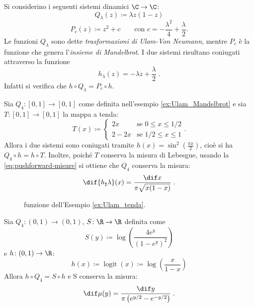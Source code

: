 \begin{example} \label{ex:Ulam_Mandelbrot}
Si considerino i seguenti sistemi dinamici $ \C \to \C$:
\[ Q_\lambda(z) \coloneqq \lambda z (1-z) \]
\[ P_c(z) \coloneqq z^2 + c \qquad \text{con } c = - \frac{\lambda^2}{4} +  \frac{\lambda}{2}. \]
Le funzioni $ Q_\lambda $ sono dette \emph{trasformazioni di Ulam-Von Neumann}, mentre $P_c$ è la funzione che genera l'\emph{insieme di Mandelbrot}.
I due sistemi risultano coniugati attraverso la funzione
\[ h_\lambda(z) = -\lambda z + \frac{\lambda}{2}\;. \]
Infatti si verifica che $ h\circ Q_\lambda = P_c \circ h $.
\end{example}

\begin{example} \label{ex:Ulam_tenda}
    Sia $ Q_4 \colon [0,1] \to [0,1] $ come definita nell'esempio \ref{ex:Ulam_Mandelbrot} e sia $ T\colon [0,1] \to [0,1] $ la mappa a tenda:
    \[
        T(x) \coloneqq
        \begin{cases}
            2x   & \text{se } 0 \leq x \leq 1/2 \\
            2-2x & \text{se } 1/2 \leq x \leq 1
        \end{cases}.
    \]
    Allora i due sistemi sono coniugati tramite $ h(x) = \sin^2\left(\frac{\pi x}{2}\right) $, cioè si ha $ Q_4\circ h = h\circ T $.
    Inoltre, poiché $ T $ conserva la misura di Lebesgue, usando la \eqref{eq:pushforward-misure} si ottiene che $ Q_4 $ conserva la misura:
    \[ \dif{h_\sharp \lambda}(x) = \frac{\dif x}{\pi\sqrt{x(1-x)}}\; . \]

    \begin{figure}
        \begin{center}
            \subfloat[Trasformazione $ Q_4 $]
            {  }
        \end{center}
        \caption{funzione dell'Esempio \ref{ex:Ulam_tenda}.}
    \end{figure}
\end{example}

\begin{example}
    Sia $ Q_4\colon (0,1)\to(0,1) $, $ S\colon \R \to \R $ definita come
    \[ S(y) \coloneqq \log\left(\frac{4 e^y}{(1-e^y)^2}\right) \]
    e $ h\colon (0,1)\to\R $:
    \[ h(x) \coloneqq \operatorname{logit}(x) \coloneqq \log\left(\frac{x}{1-x}\right) \]
    Allora $ h\circ Q_4 = S \circ h $ e S conserva la misura:
    \[ \dif\mu(y) = \frac{\dif y}{\pi\left( e^{y/2} - e^{-y/2} \right) } \; . \]
\end{example}

